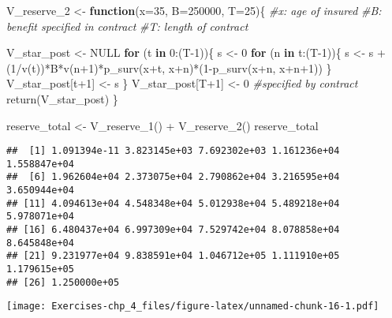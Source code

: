 \documentclass[
]{article}
\newenvironment{Shaded}{\begin{snugshade}}{\end{snugshade}}
\newcommand{\AttributeTok}[1]{\textcolor[rgb]{0.77,0.63,0.00}{#1}}
\newcommand{\CommentTok}[1]{\textcolor[rgb]{0.56,0.35,0.01}{\textit{#1}}}
\newcommand{\ConstantTok}[1]{\textcolor[rgb]{0.00,0.00,0.00}{#1}}
\newcommand{\ControlFlowTok}[1]{\textcolor[rgb]{0.13,0.29,0.53}{\textbf{#1}}}
\newcommand{\DecValTok}[1]{\textcolor[rgb]{0.00,0.00,0.81}{#1}}
\newcommand{\FunctionTok}[1]{\textcolor[rgb]{0.00,0.00,0.00}{#1}}
\newcommand{\NormalTok}[1]{#1}
\newcommand{\OtherTok}[1]{\textcolor[rgb]{0.56,0.35,0.01}{#1}}
\newcommand{\SpecialCharTok}[1]{\textcolor[rgb]{0.00,0.00,0.00}{#1}}
\begin{document}
\begin{Shaded}
\begin{Highlighting}[]
\NormalTok{V\_reserve\_2 }\OtherTok{\textless{}{-}} \ControlFlowTok{function}\NormalTok{(}\AttributeTok{x=}\DecValTok{35}\NormalTok{, }\AttributeTok{B=}\DecValTok{250000}\NormalTok{, }\AttributeTok{T=}\DecValTok{25}\NormalTok{)\{}
  \CommentTok{\#x: age of insured}
  \CommentTok{\#B: benefit specified in contract}
  \CommentTok{\#T: length of contract }
  
\NormalTok{  V\_star\_post }\OtherTok{\textless{}{-}} \ConstantTok{NULL}
  \ControlFlowTok{for}\NormalTok{ (t }\ControlFlowTok{in} \DecValTok{0}\SpecialCharTok{:}\NormalTok{(T}\DecValTok{{-}1}\NormalTok{))\{}
\NormalTok{    s }\OtherTok{\textless{}{-}} \DecValTok{0} 
    \ControlFlowTok{for}\NormalTok{ (n }\ControlFlowTok{in}\NormalTok{ t}\SpecialCharTok{:}\NormalTok{(T}\DecValTok{{-}1}\NormalTok{))\{}
\NormalTok{      s }\OtherTok{\textless{}{-}}\NormalTok{ s }\SpecialCharTok{+}\NormalTok{ (}\DecValTok{1}\SpecialCharTok{/}\FunctionTok{v}\NormalTok{(t))}\SpecialCharTok{*}\NormalTok{B}\SpecialCharTok{*}\FunctionTok{v}\NormalTok{(n}\SpecialCharTok{+}\DecValTok{1}\NormalTok{)}\SpecialCharTok{*}\FunctionTok{p\_surv}\NormalTok{(x}\SpecialCharTok{+}\NormalTok{t, x}\SpecialCharTok{+}\NormalTok{n)}\SpecialCharTok{*}\NormalTok{(}\DecValTok{1}\SpecialCharTok{{-}}\FunctionTok{p\_surv}\NormalTok{(x}\SpecialCharTok{+}\NormalTok{n, x}\SpecialCharTok{+}\NormalTok{n}\SpecialCharTok{+}\DecValTok{1}\NormalTok{))}
\NormalTok{    \}}
\NormalTok{    V\_star\_post[t}\SpecialCharTok{+}\DecValTok{1}\NormalTok{] }\OtherTok{\textless{}{-}}\NormalTok{ s }
\NormalTok{  \}}
\NormalTok{  V\_star\_post[T}\SpecialCharTok{+}\DecValTok{1}\NormalTok{] }\OtherTok{\textless{}{-}} \DecValTok{0} \CommentTok{\#specified by contract}
  \FunctionTok{return}\NormalTok{(V\_star\_post)}
\NormalTok{\}}

\NormalTok{reserve\_total }\OtherTok{\textless{}{-}} \FunctionTok{V\_reserve\_1}\NormalTok{() }\SpecialCharTok{+} \FunctionTok{V\_reserve\_2}\NormalTok{()}
\NormalTok{reserve\_total}
\end{Highlighting}
\end{Shaded}

\begin{verbatim}
##  [1] 1.091394e-11 3.823145e+03 7.692302e+03 1.161236e+04 1.558847e+04
##  [6] 1.962604e+04 2.373075e+04 2.790862e+04 3.216595e+04 3.650944e+04
## [11] 4.094613e+04 4.548348e+04 5.012938e+04 5.489218e+04 5.978071e+04
## [16] 6.480437e+04 6.997309e+04 7.529742e+04 8.078858e+04 8.645848e+04
## [21] 9.231977e+04 9.838591e+04 1.046712e+05 1.111910e+05 1.179615e+05
## [26] 1.250000e+05
\end{verbatim}

\texttt{[image: Exercises-chp\_4\_files/figure-latex/unnamed-chunk-16-1.pdf]}
\end{document}

